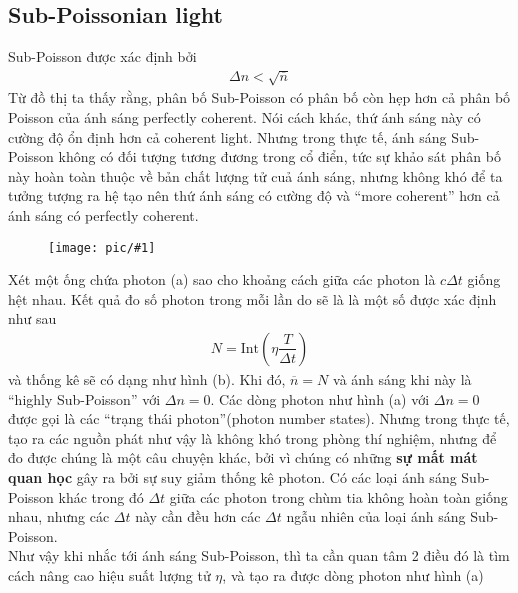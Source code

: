 \documentclass{report}
\newcommand{\image}[1]{
\begin{figure}[H]
	\centering
	\texttt{[image: pic/\#1]}
	\label{#1}
\end{figure}
}
\newcommand{\q}[1]{``#1''}
\newcommand{\f}[2]{\dfrac{#1}{#2}}
\begin{document}
\subsection{Sub-Poissonian light}
Sub-Poisson được xác định bởi
\begin{gather}
	\Delta n < \sqrt{\overline{n}}
\end{gather}
Từ đồ thị ta thấy rằng, phân bố Sub-Poisson có phân bố còn hẹp hơn cả phân bố Poisson của ánh sáng perfectly coherent. Nói cách khác, thứ ánh sáng này có cường độ ổn định hơn cả coherent light. Nhưng trong thực tế, ánh sáng Sub-Poisson không có đối tượng tương đương trong cổ điển, tức sự khảo sát phân bố này hoàn toàn thuộc về bản chất lượng tử cuả ánh sáng, nhưng không khó để ta tưởng tượng ra hệ tạo nên thứ ánh sáng có cường độ và \q{more coherent} hơn cả ánh sáng có perfectly coherent.\\
\image{tubephoton.png}
\noindent Xét một ống chứa photon (a) sao cho khoảng cách giữa các photon là $c\Delta t$ giống hệt nhau. Kết quả đo số photon trong mỗi lần do sẽ là là một số được xác định như sau
\begin{gather}
	N = \text{Int}\left(\eta \f{T}{\Delta t}\right)
\end{gather}
và thống kê sẽ có dạng như hình (b). Khi đó, $\overline{n} = N$ và ánh sáng khi này là \q{highly Sub-Poisson} với $\Delta n = 0$. Các dòng photon như hình (a) với $\Delta n =0$ được gọi là các \q{trạng thái photon}(photon number states). Nhưng trong thực tế, tạo ra các nguồn phát như vậy là không khó trong phòng thí nghiệm, nhưng để đo được chúng là một câu chuyện khác, bởi vì chúng có những \textbf{sự mất mát quan học} gây ra bởi sự suy giảm thống kê photon. Có các loại ánh sáng Sub-Poisson khác trong đó $\Delta t$ giữa các photon trong chùm tia không hoàn toàn giống nhau, nhưng các $\Delta t$ này cần đều hơn các $\Delta t$ ngẫu nhiên của loại ánh sáng Sub-Poisson. \\
Như vậy khi nhắc tới ánh sáng Sub-Poisson, thì ta cần quan tâm 2 điều đó là tìm cách nâng cao hiệu suất lượng tử $\eta$, và tạo ra được dòng photon như hình (a)
\end{document}
